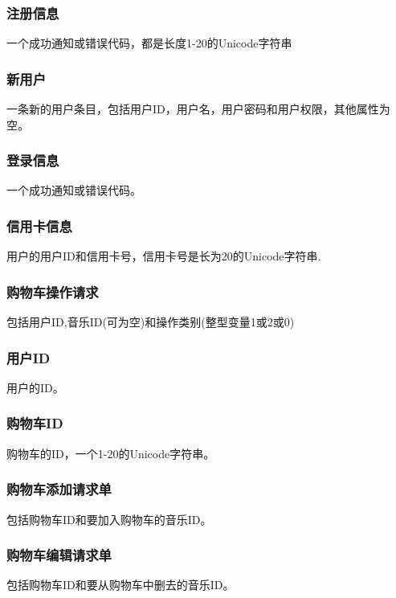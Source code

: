 \subsubsection{注册信息}

一个成功通知或错误代码，都是长度1-20的Unicode字符串

\subsubsection{新用户}

一条新的用户条目，包括用户ID，用户名，用户密码和用户权限，其他属性为空。

\subsubsection{登录信息}

一个成功通知或错误代码。

\subsubsection{信用卡信息}

用户的用户ID和信用卡号，信用卡号是长为20的Unicode字符串.

\subsubsection{购物车操作请求}

包括用户ID,音乐ID(可为空)和操作类别(整型变量1或2或0)

\subsubsection{用户ID}

用户的ID。

\subsubsection{购物车ID}

购物车的ID，一个1-20的Unicode字符串。

\subsubsection{购物车添加请求单}

包括购物车ID和要加入购物车的音乐ID。

\subsubsection{购物车编辑请求单}
包括购物车ID和要从购物车中删去的音乐ID。

